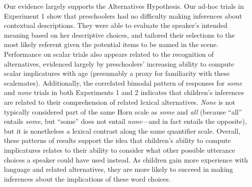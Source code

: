 \documentclass[10pt,letterpaper]{article}
\begin{document}
Our evidence largely supports the Alternatives Hypothesis. Our ad-hoc trials in Experiment 1 show that preschoolers had no difficulty making inferences about contextual descriptions. They were able to evaluate the speaker's intended meaning based on her descriptive choices, and tailored their selections to the most likely referent given the potential items to be named in the scene. Performance on scalar trials also appears related to the recognition of alternatives, evidenced largely by preschoolers' increasing ability to compute scalar implicatures with age (presumably a proxy for familiarity with these scalemates). Additionally, the correlated bimodal pattern of responses for \emph{some} and \emph{none} trials in both Experiments 1 and 2 indicates that children's inferences are related to their comprehension of related lexical alternatives. \emph{None} is not typically considered part of the same Horn scale as \emph{some} and \emph{all} (because ``all'' entails \emph{some}, but ``some'' does not entail \emph{none}---and in fact entails the opposite), but it is nonetheless a lexical contrast along the same quantifier scale. Overall, these patterns of results support the idea that children's ability to compute implicatures relates to their ability to consider what other possible utterance choices a speaker could have used instead.  As children gain more experience with language and related alternatives, they are more likely to succeed in making inferences about the implications of these word choices. 







\end{document}
